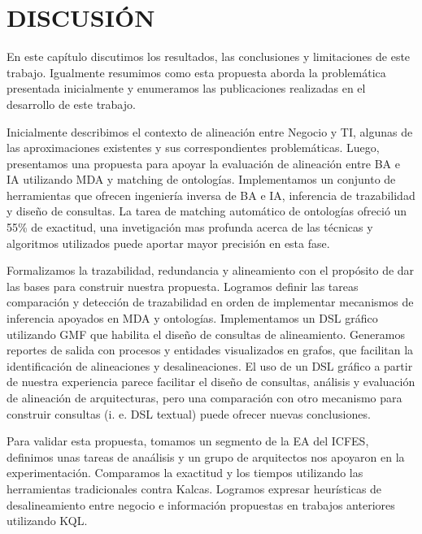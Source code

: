 \chapter{DISCUSI\'ON} \label{cha:conclusions}

En este cap\'itulo discutimos los resultados, las conclusiones y limitaciones de este trabajo. Igualmente resumimos como esta propuesta aborda la problem\'atica presentada inicialmente y enumeramos las publicaciones realizadas en el desarrollo de este trabajo.

Inicialmente describimos el contexto de alineaci\'on entre Negocio y TI, algunas de las aproximaciones existentes y sus correspondientes problem\'aticas. Luego, presentamos una propuesta para apoyar la evaluaci\'on de alineaci\'on entre BA e IA utilizando MDA y matching de ontolog\'ias. Implementamos un conjunto de herramientas que ofrecen ingenier\'ia inversa de BA e IA, inferencia de trazabilidad y dise\~no de consultas. La tarea de matching autom\'atico de ontolog\'ias ofreci\'o un 55\% de exactitud, una invetigaci\'on mas profunda acerca de las t\'ecnicas y algoritmos utilizados puede aportar mayor precisi\'on en esta fase.

Formalizamos la trazabilidad, redundancia y alineamiento con el prop\'osito de dar las bases para construir nuestra propuesta. Logramos definir las tareas comparaci\'on y detecci\'on de trazabilidad en orden de implementar mecanismos de inferencia apoyados en MDA y ontolog\'ias. Implementamos un DSL gr\'afico utilizando GMF que habilita el dise\~no de consultas de alineamiento. Generamos reportes de salida con procesos y entidades visualizados en grafos, que facilitan la identificaci\'on de alineaciones y desalineaciones. El uso de un DSL gr\'afico a partir de nuestra experiencia parece facilitar el dise\~no de consultas, an\'alisis y evaluaci\'on de alineaci\'on de arquitecturas, pero una comparaci\'on con otro mecanismo para construir consultas (i. e. DSL textual) puede ofrecer nuevas conclusiones.

Para validar esta propuesta, tomamos un segmento de la EA del ICFES, definimos unas tareas de ana\'alisis y un grupo de arquitectos nos apoyaron en la experimentaci\'on. Comparamos la exactitud y los tiempos utilizando las herramientas tradicionales contra Kalcas. Logramos expresar heur\'isticas de desalineamiento entre negocio e informaci\'on propuestas en trabajos anteriores utilizando KQL. 


